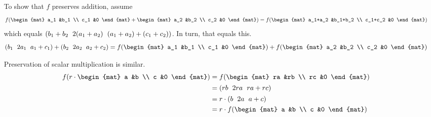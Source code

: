 \begin{frame}
To show that $f$ preserves addition, assume
\begin{equation*}
 f(
  \begin{mat}
    a_1 &b_1 \\
    c_1 &0
  \end{mat}
  +
  \begin{mat}
    a_2 &b_2 \\
    c_2 &0
  \end{mat}
  )
  =f(
  \begin{mat}
    a_1+a_2 &b_1+b_2 \\
    c_1+c_2 &0
  \end{mat}
  )
\end{equation*}
which equals $\rowvec{b_1+b_2 &2(a_1+a_2) &(a_1+a_2)+(c_1+c_2)}$.
In turn, that equals this. 
\begin{equation*}
\rowvec{b_1 &2a_1 &a_1+c_1}+\rowvec{b_2 &2a_2 &a_2+c_2}
  =f(
  \begin{mat}
    a_1 &b_1 \\
    c_1 &0
  \end{mat})
  +
  f(
  \begin{mat}
    a_2 &b_2 \\
    c_2 &0
  \end{mat})
\end{equation*}

\pause
Preservation of scalar multiplication is similar.
\begin{align*}
  f(r\cdot
  \begin{mat}
    a &b \\
    c &0
  \end{mat}
  )
  &=f(
  \begin{mat}
    ra &rb \\
    rc &0
  \end{mat}
  )                                 \\
  &=\rowvec{rb &2ra &ra+rc}         \\
  &=r\cdot\rowvec{b &2a &a+c}         \\
  &=r\cdot f(
  \begin{mat}
    a &b \\
    c &0
  \end{mat}
  )
\end{align*}
\end{frame}





